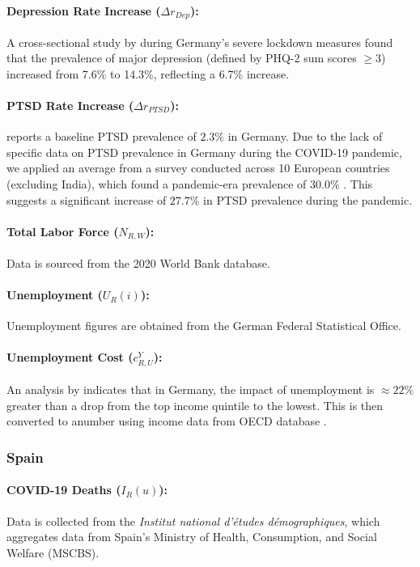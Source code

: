 \documentclass[msom,blindrev]{informs3} %
\begin{document}
\begin{APPENDICES}
\paragraph{Depression Rate Increase ($\Delta r_{Dep}$):} A cross-sectional study by  during Germany’s severe lockdown measures found that the prevalence of major depression (defined by PHQ-2 sum scores $\geq 3$) increased from 7.6\% to 14.3\%, reflecting a 6.7\% increase.

\paragraph{PTSD Rate Increase ($\Delta r_{PTSD}$):}  reports a baseline PTSD prevalence of $2.3\%$ in Germany. Due to the lack of specific data on PTSD prevalence in Germany during the COVID-19 pandemic, we applied an average from a survey conducted across 10 European countries (excluding India), which found a pandemic-era prevalence of $30.0\%$ . This suggests a significant increase of $27.7\%$ in PTSD prevalence during the pandemic.

\paragraph{Total Labor Force ($N_{R,W}$):} Data is sourced from the 2020 World Bank database.

\paragraph{Unemployment ($U_R(i)$):} Unemployment figures are obtained from the German Federal Statistical Office.

\paragraph{Unemployment Cost ($c^Y_{R,U}$):} An analysis by  indicates that in Germany, the impact of unemployment is $\approx22\%$ greater than a drop from the top income quintile to the lowest. This is then converted to anumber using income data from OECD database .


\subsubsection{Spain}
\paragraph{COVID-19 Deaths ($I_R(u)$):} Data is collected from the \emph{Institut national d'études démographiques}, which aggregates data from Spain’s Ministry of Health, Consumption, and Social Welfare (MSCBS).

\end{APPENDICES}
\end{document}
